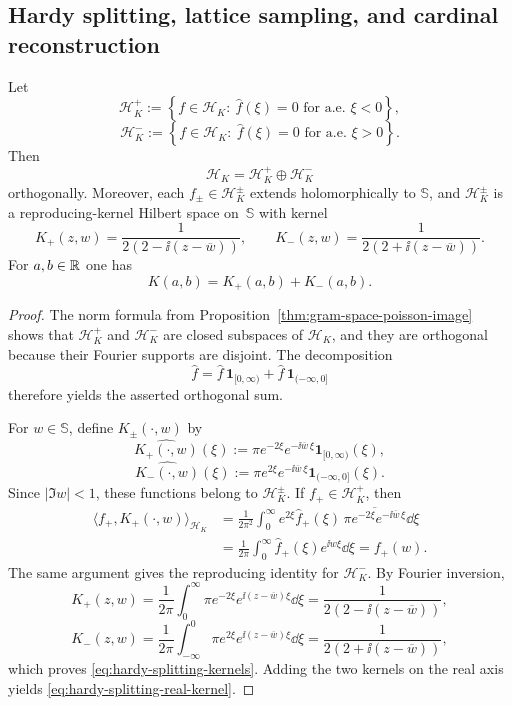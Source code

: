 \subsection{Hardy splitting, lattice sampling, and cardinal reconstruction}

\begin{proposition}%
\label{prop:poisson-hardy-splitting}
Let
\[
\mathcal H_K^+
:=
\left\{
f\in\mathcal H_K:\ \widehat f(\xi)=0 \text{ for a.e. }\xi<0
\right\},
\]
\[
\mathcal H_K^-
:=
\left\{
f\in\mathcal H_K:\ \widehat f(\xi)=0 \text{ for a.e. }\xi>0
\right\}.
\]
Then
\[
\mathcal H_K=\mathcal H_K^+\oplus \mathcal H_K^-
\]
orthogonally.  Moreover, each $f_\pm\in\mathcal H_K^\pm$ extends
holomorphically to $\mathbb S$, and $\mathcal H_K^\pm$ is a
reproducing-kernel Hilbert space on~$\mathbb S$ with kernel
\begin{equation}\label{eq:hardy-splitting-kernels}
K_+(z,w)=\frac{1}{2(2-\ii(z-\overline w))},
\qquad
K_-(z,w)=\frac{1}{2(2+\ii(z-\overline w))}.
\end{equation}
For $a,b\in\mathbb{R}$ one has
\begin{equation}\label{eq:hardy-splitting-real-kernel}
K(a,b)=K_+(a,b)+K_-(a,b).
\end{equation}
\end{proposition}

\begin{proof}
The norm formula from Proposition~\ref{thm:gram-space-poisson-image}
shows that $\mathcal H_K^+$ and $\mathcal H_K^-$ are closed subspaces of
$\mathcal H_K$, and they are orthogonal because their Fourier supports are
disjoint.  The decomposition
\[
\widehat f
=\widehat f\,\mathbf 1_{[0,\infty)}
+\widehat f\,\mathbf 1_{(-\infty,0]}
\]
therefore yields the asserted orthogonal sum.

For $w\in\mathbb S$, define $K_\pm(\cdot,w)$ by
\[
\widehat{K_+(\cdot,w)}(\xi)
:=
\pi e^{-2\xi}e^{-\ii\overline w\,\xi}\mathbf 1_{[0,\infty)}(\xi),
\]
\[
\widehat{K_-(\cdot,w)}(\xi)
:=
\pi e^{2\xi}e^{-\ii\overline w\,\xi}\mathbf 1_{(-\infty,0]}(\xi).
\]
Since $|\Im w|<1$, these functions belong to $\mathcal H_K^\pm$.  If
$f_+\in\mathcal H_K^+$, then
\begin{align*}
\langle f_+,K_+(\cdot,w)\rangle_{\mathcal H_K}
&=
\frac{1}{2\pi^2}\int_0^\infty
e^{2\xi}\widehat f_+(\xi)\,
\overline{\pi e^{-2\xi}e^{-\ii\overline w\,\xi}}\dd\xi \\
&=
\frac{1}{2\pi}\int_0^\infty \widehat f_+(\xi)e^{\ii w\xi}\dd\xi
=f_+(w).
\end{align*}
The same argument gives the reproducing identity for $\mathcal H_K^-$.  By
Fourier inversion,
\[
K_+(z,w)
=\frac{1}{2\pi}\int_0^\infty
\pi e^{-2\xi}e^{\ii(z-\overline w)\xi}\dd\xi
=\frac{1}{2(2-\ii(z-\overline w))},
\]
\[
K_-(z,w)
=\frac{1}{2\pi}\int_{-\infty}^0
\pi e^{2\xi}e^{\ii(z-\overline w)\xi}\dd\xi
=\frac{1}{2(2+\ii(z-\overline w))},
\]
which proves \eqref{eq:hardy-splitting-kernels}.  Adding the two kernels
on the real axis yields \eqref{eq:hardy-splitting-real-kernel}.
\end{proof}

